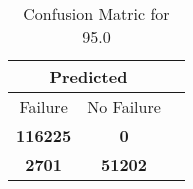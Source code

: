 \begin{table}[] 
\caption{Confusion Matric for 95.0} 
\label{Table: Prediction Accuracy-DMD95.0OnlySunEKF-combinationReflectionperfectNoFailurePrediction-Reflection} 
\centering 
\begin{tabular} 
 {@{}ccc@{}} 
\toprule 
\multicolumn{2}{c}{\textbf{Predicted}}
 \\ \midrule 
\multicolumn{1}{|c|}{Failure} & 
\multicolumn{1}{c|}{No Failure}
 \\ \midrule 
\multicolumn{1}{|c|}{\color{green}\textbf{116225}} & 
\multicolumn{1}{c|}{\color{red}\textbf{0}}
 \\ \midrule 
\multicolumn{1}{|c|}{\color{red}\textbf{2701}} & 
\multicolumn{1}{c|}{\color{green}\textbf{51202}}
 \\ \bottomrule 
\end{tabular} 
\end{table} 
